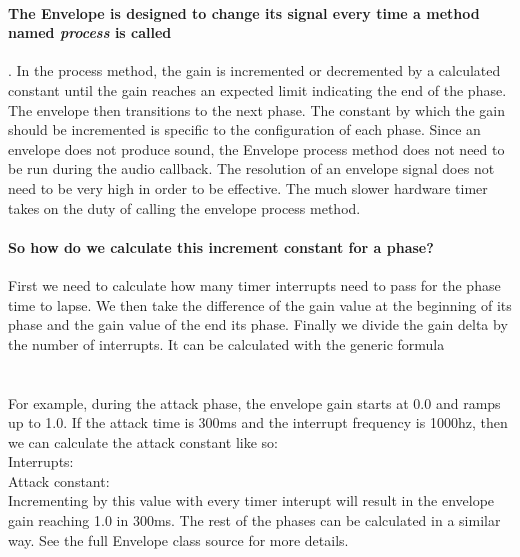 \documentclass[acmlarge,screen]{acmart}
\begin{document}
	\paragraph{The Envelope is designed to change its signal every time a method named \textit{process} is called}. In the process method, the gain is incremented or decremented by a calculated constant until the gain reaches an expected limit indicating the end of the phase. The envelope then transitions to the next phase. The constant by which the gain should be incremented is specific to the configuration of each phase. Since an envelope does not produce sound, the Envelope process method does not need to be run during the audio callback. The resolution of an envelope signal does not need to be very high in order to be effective. The much slower hardware timer takes on the duty of calling the envelope process method.
	
	\paragraph{So how do we calculate this increment constant for a phase?} First we need to calculate how many timer interrupts need to pass for the phase time to lapse. We then take the difference of the gain value at the beginning of its phase and the gain value of the end its phase. Finally we divide the gain delta by the number of interrupts. It can be calculated with the generic formula \\
		
	 \\[4pt]
	
	 \\[4pt]
	
	For example, during the attack phase, the envelope gain starts at 0.0 and ramps up to 1.0. If the attack time is 300ms and the interrupt frequency is 1000hz, then we can calculate the attack constant like so:\\
	
	Interrupts:  \\[4pt]
	
	Attack constant:  \\[4pt]
	
	Incrementing by this value with every timer interupt will result in the envelope gain reaching 1.0 in 300ms. The rest of the phases can be calculated in a similar way. See the full Envelope class source for more details.
	
\end{document}
